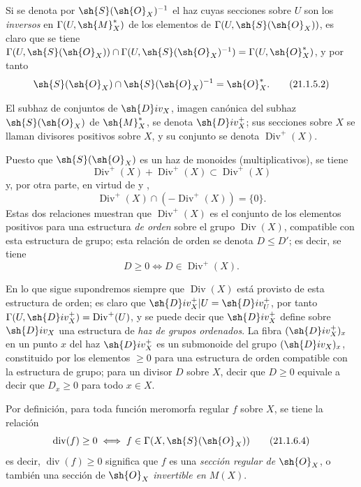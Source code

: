 Si se denota por $\sh{S}(\sh{O}_X)^{-1}$ el haz cuyas secciones sobre $U$ son los \emph{inversos} en $\Gamma(U,\sh{M}_X^*)$ de los elementos de $\Gamma(U,\sh{S}(\sh{O}_X))$, es claro que se tiene $\Gamma(U,\sh{S}(\sh{O}_X))\cap\Gamma(U,\sh{S}(\sh{O}_X)^{-1})=\Gamma(U,\sh{O}_X^*)$, y por tanto
\[
\label{IV.21.1.5.2}
  \sh{S}(\sh{O}_X)\cap\sh{S}(\sh{O}_X)^{-1}=\sh{O}_X^*.
  \tag{21.1.5.2}
\]

\begin{definition}[21.1.6]
\label{IV.21.1.6}
El subhaz de conjuntos de $\sh{D}iv_X$, imagen canónica del subhaz $\sh{S}(\sh{O}_X)$ de $\sh{M}_X^*$, se denota $\sh{D}iv_X^+$; sus secciones sobre $X$ se llaman divisores positivos sobre $X$, y su conjunto se denota $\operatorname{Div}^+(X)$.
\end{definition}

Puesto que $\sh{S}(\sh{O}_X)$ es un haz de monoides (multiplicativos), se tiene
\[
\label{IV.21.1.6.1}
  \operatorname{Div}^+(X)+\operatorname{Div}^+(X)\subset\operatorname{Div}^+(X)
  \tag{21.1.6.1}
\]
y, por otra parte, en virtud de  y ,
\[
\label{IV.21.1.6.2}
  \operatorname{Div}^+(X)\cap(-\operatorname{Div}^+(X))=\{0\}.
  \tag{21.1.6.2}
\]
Estas dos relaciones muestran que $\operatorname{Div}^+(X)$ es el conjunto de los elementos positivos para una estructura \emph{de orden} sobre el grupo $\operatorname{Div}(X)$, compatible con esta estructura de grupo; esta relación de orden se denota $D\leq D'$; es decir, se tiene
\[
\label{IV.21.1.6.3}
  D\geq0 \iff D\in\operatorname{Div}^+(X).
  \tag{21.1.6.3}
\]

En lo que sigue supondremos siempre que $\operatorname{Div}(X)$ está provisto de esta estructura de orden;
es claro que $\sh{D}iv_X^+|U=\sh{D}iv_U^+$, por tanto $\Gamma(U,\sh{D}iv_X^+)=\operatorname{Div}^+(U)$, y se puede decir que $\sh{D}iv_X^+$ define sobre $\sh{D}iv_X$ una estructura de \emph{haz de grupos ordenados}.
La fibra $(\sh{D}iv_X^+)_x$ en un punto $x$ del haz $\sh{D}iv_X^+$ es un submonoide del grupo $(\sh{D}iv_X)_x$, constituido por los elementos $\geq0$ para una estructura de orden compatible con la estructura de grupo;
para un divisor $D$ sobre $X$, decir que $D\geq0$ equivale a decir que $D_x\geq0$ para todo $x\in X$.

Por definición, para toda función meromorfa regular $f$ sobre $X$, se tiene la relación
\[
\label{IV.21.1.6.4}
  \operatorname{div}(f)\geq0 \iff f\in\Gamma(X,\sh{S}(\sh{O}_X))
  \tag{21.1.6.4}
\]
es decir, $\operatorname{div}(f)\geq0$ significa que $f$ es una \emph{sección regular de} $\sh{O}_X$, o también una sección de $\sh{O}_X$ \emph{invertible en} $M(X)$.

